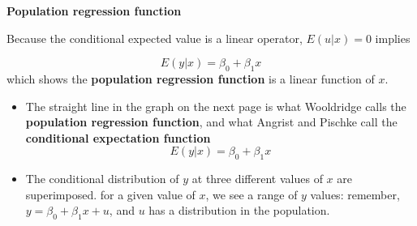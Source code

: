 \documentclass[notes=show]{beamer}
\begin{document}
\begin{frame}[plain]
\begin{center}
\textbf{Population regression function}
\end{center}
Because the conditional expected value is a linear operator, $E(u|x)=0$ implies

  \begin{equation}
   E(y|x)=\beta _{0}+\beta _{1}x
  \end{equation}
 which shows the \textbf{population regression function} is a linear function of $x$.

\end{frame}


\begin{frame}[plain]

\begin{itemize}
  \item The straight line in the graph on the next page is what Wooldridge calls the \textbf{population regression function}, and what Angrist and Pischke call the \textbf{conditional expectation function}$$E(y|x)=\beta _{0}+\beta _{1}x$$
  \item The conditional distribution of $y$ at three different values of $x$ are superimposed. for a given value of $x$, we see a range of $y$ values: remember, $y=\beta_{0}+\beta _{1}x+u$, and $u$ has a distribution in the population.
\end{itemize}

\end{frame}
\end{document}
